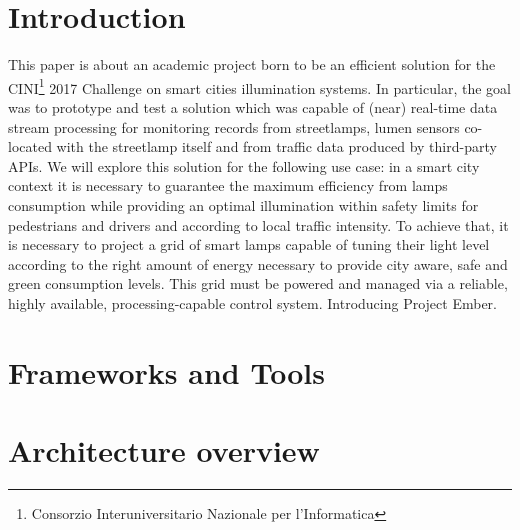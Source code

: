 \section{Introduction}
This paper is about an academic project born to be an efficient solution for the CINI\footnote{Consorzio Interuniversitario Nazionale per l'Informatica} 2017 Challenge on smart cities illumination systems. In particular, the goal was to prototype and test a solution which was capable of (near) real-time data stream processing for monitoring records from streetlamps, lumen sensors co-located with the streetlamp itself and from traffic data produced by third-party APIs. We will explore this solution for the following use case: in a smart city context it is necessary to guarantee the maximum efficiency from lamps consumption while providing an optimal illumination within safety limits for pedestrians and drivers and according to local traffic intensity. To achieve that, it is necessary to project a grid of smart lamps capable of tuning their light level according to the right amount of energy necessary to provide city aware, safe and green consumption levels. This grid must be powered and managed via a reliable, highly available, processing-capable control system. Introducing Project Ember.

\section{Frameworks and Tools}

\section{Architecture overview}


